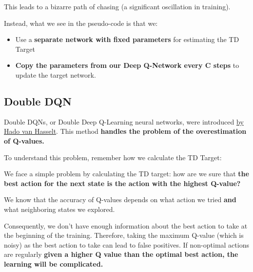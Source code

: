 \documentclass[11pt,a4paper]{article}
\begin{document}
This leads to a bizarre path of chasing (a significant oscillation in training).


Instead, what we see in the pseudo-code is that we:

\begin{itemize}
\tightlist
\item
  Use a \textbf{separate network with fixed parameters} for estimating the TD Target
\item
  \textbf{Copy the parameters from our Deep Q-Network every C steps} to update the target network.
\end{itemize}


\subsection{Double DQN}\label{double-dqn}

Double DQNs, or Double Deep Q-Learning neural networks, were introduced \href{https://papers.nips.cc/paper/3964-double-q-learning}{by Hado van Hasselt}. This method \textbf{handles the problem of the overestimation of Q-values.}

To understand this problem, remember how we calculate the TD Target:


We face a simple problem by calculating the TD target: how are we sure that \textbf{the best action for the next state is the action with the highest Q-value?}

We know that the accuracy of Q-values depends on what action we tried \textbf{and} what neighboring states we explored.

Consequently, we don't have enough information about the best action to take at the beginning of the training. Therefore, taking the maximum Q-value (which is noisy) as the best action to take can lead to false positives. If non-optimal actions are regularly \textbf{given a higher Q value than the optimal best action, the learning will be complicated.}
\end{document}
